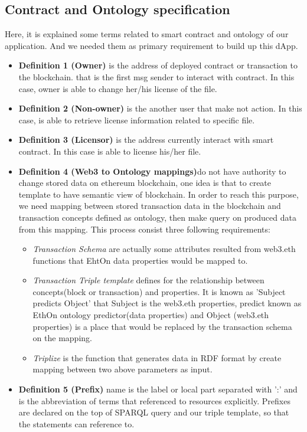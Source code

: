 \subsection{Contract and Ontology specification}
Here, it is explained some terms related to smart contract and ontology of our application. And we needed them as primary requirement to build up this dApp.
\begin{itemize}
	\item \textbf{Definition 1 (Owner)} is the address of deployed contract or transaction to the blockchain. that is the first msg sender to interact with contract. In this case, owner is able to change her/his license of the file.\\
	\item \textbf{Definition 2 (Non-owner)} is the another user that make not action. In this case, is able to retrieve license information related to specific file.\\
	\item \textbf{Definition 3 (Licensor)} is the address currently interact with smart contract. In this case is able to license his/her file.\\ 
	\item \textbf{Definition 4 (Web3 to Ontology mappings)}do not have authority to change stored data on ethereum blockchain, one idea is that to create template to have semantic view of blockchain.
	In order to reach this purpose, we need mapping between stored transaction data in the blockchain and transaction concepts defined as ontology, then make query on produced data from this mapping. This process consist three following requirements:
	
	\begin{itemize}
		\item \textit{Transaction Schema} are actually some attributes resulted from web3.eth functions that EhtOn data properties would be mapped to.
		\item \textit{Transaction Triple template} defines for the relationship between concepts(block or transaction) and properties. It is known as 'Subject predicts Object' that Subject is the web3.eth properties, predict known as EthOn ontology predictor(data properties) and Object (web3.eth properties) is a place that would be replaced by the transaction schema on the mapping. 
		\item \textit{Triplize} is the function that generates data in RDF format by create mapping between two above parameters as input. 
	\end{itemize} 
     \item \textbf{Definition 5 (Prefix)} name is the label or local part separated with ':' and is the abbreviation of terms that referenced to resources explicitly. Prefixes are declared on the top of SPARQL query and our triple template, so that the statements can reference to.  
\end{itemize}
